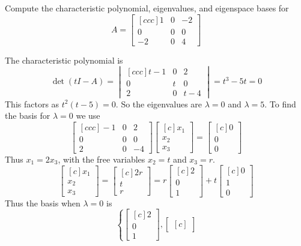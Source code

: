 \ii Compute the characteristic polynomial, eigenvalues, and eigenspace bases for
$$A=
\begin{bmatrix}[ccc]
1&0&-2\\
0&0&0\\
-2&0&4
\end{bmatrix}
$$
\begin{solution}
The characteristic polynomial is
$$
\det(t I - A) =
\begin{vmatrix}[ccc]
t - 1&0&2\\
0&t &0\\
2&0&t -4
\end{vmatrix}
=
t^3-5t = 0
$$
This factors as $t^2(t - 5)=0$. So the eigenvalues are $\lambda =0$ and $\lambda = 5$. To find the basis for $\lambda = 0$ we use
$$
\begin{bmatrix}[ccc]
-1&0&2\\
0&0&0\\
2&0&-4
\end{bmatrix}
\begin{bmatrix}[c]
x_1\\
x_2\\
x_3
\end{bmatrix}
=
\begin{bmatrix}[c]
0\\
0\\
0
\end{bmatrix}
$$
Thus $x_1 = 2x_3$, with the free variables $x_2=t$ and $x_3=r$.
$$
\begin{bmatrix}[c]
x_1\\
x_2\\
x_3
\end{bmatrix}
=
\begin{bmatrix}[c]
2r\\
t\\
r
\end{bmatrix}
=
r
\begin{bmatrix}[c]
2\\
0\\
1
\end{bmatrix} +t
\begin{bmatrix}[c]
0\\
1\\
0
\end{bmatrix}
$$
Thus the basis when $\lambda = 0$ is
$$
\left\{
\begin{bmatrix}[c]
2\\
0\\
1
\end{bmatrix},
\begin{bmatrix}[c]

\end{bmatrix}$$
\end{solution}
